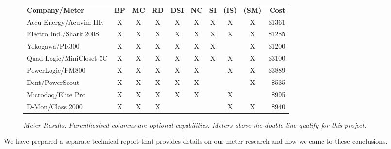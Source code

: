 \documentclass[11pt]{article}
\begin{document}
\begin{figure}[!ht]
\small
\begin{tabular}{lccccccccr} \hline
{\bf Company/Meter }          & {\bf BP } & {\bf MC} & {\bf RD} & {\bf DSI} & {\bf NC} & {\bf SI} & {\bf (IS)} & {\bf (SM)} & {\bf Cost}   \\ 
Accu-Energy/Acuvim IIR       &   X           &           X    &           X   &          X    &          X     &         X   &          X    &         X   &        \$1361 \\ 
Electro Ind./Shark 200S        &      X        &           X    &           X   &          X    &          X     &         X   &          X    &         X   &        \$1285 \\ 
Yokogawa/PR300                  &      X        &           X    &           X   &          X    &          X     &         X   &                &         X     &          \$1200 \\  
Quad-Logic/MiniCloset 5C   &   X           &           X    &           X   &          X    &          X     &        X    &          X    &         X   &         \$3100 \\   \hline \hline
PowerLogic/PM800                &      X        &           X    &           X   &          X    &          X     &              &          X    &          X  &          \$3889 \\  
Dent/PowerScout                   &      X        &           X    &           X   &          X    &          X     &              &                &           X   &          \$535 \\  
Microdaq/Elite Pro                 &      X        &           X    &           X   &          X    &          X     &              &          X      &              &          \$995 \\  
D-Mon/Class 2000                 &      X       &           X    &           X   &                &                 &               &          X    &          X    &          \$940 \\  \hline
\end{tabular} 
\normalsize
\caption{{\em Meter Results. Parenthesized columns are optional capabilities. Meters above the double line qualify for this project. }}
\label{fig:meterresults}
\end{figure}

We have prepared a separate technical report \cite{Lim10} that provides details on our meter research and how we came to these conclusions. 
\end{document}
